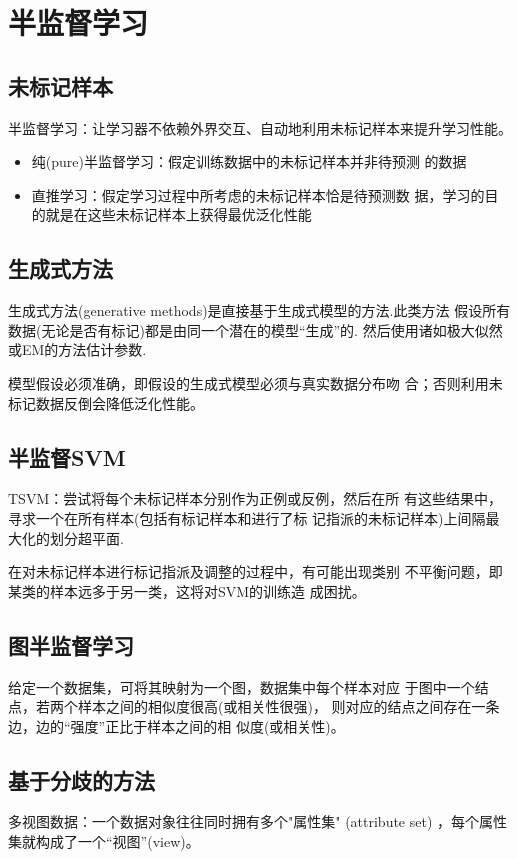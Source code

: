 \newpage
\section{半监督学习}
\subsection{未标记样本}
半监督学习：让学习器不依赖外界交互、自动地利用未标记样本来提升学习性能。

\begin{itemize}
    \item 纯(pure)半监督学习：假定训练数据中的未标记样本并非待预测
    的数据
    \item 直推学习：假定学习过程中所考虑的未标记样本恰是待预测数
    据，学习的目的就是在这些未标记样本上获得最优泛化性能
\end{itemize}

\subsection{生成式方法}
生成式方法(generative methods)是直接基于生成式模型的方法.此类方法
假设所有数据(无论是否有标记)都是由同一个潜在的模型“生成”的. 然后使用诸如极大似然或EM的方法估计参数. 

模型假设必须准确，即假设的生成式模型必须与真实数据分布吻
合；否则利用未标记数据反倒会降低泛化性能。


\subsection{半监督SVM}
TSVM：尝试将每个未标记样本分别作为正例或反例，然后在所
有这些结果中，寻求一个在所有样本(包括有标记样本和进行了标
记指派的未标记样本)上间隔最大化的划分超平面. 

在对未标记样本进行标记指派及调整的过程中，有可能出现类别
不平衡问题，即某类的样本远多于另一类，这将对SVM的训练造
成困扰。

\subsection{图半监督学习}
给定一个数据集，可将其映射为一个图，数据集中每个样本对应
于图中一个结点，若两个样本之间的相似度很高(或相关性很强)，
则对应的结点之间存在一条边，边的“强度”正比于样本之间的相
似度(或相关性)。


\subsection{基于分歧的方法}
多视图数据：一个数据对象往往同时拥有多个"属性集" (attribute set) ，每个属性集就构成了一个“视图”(view)。

